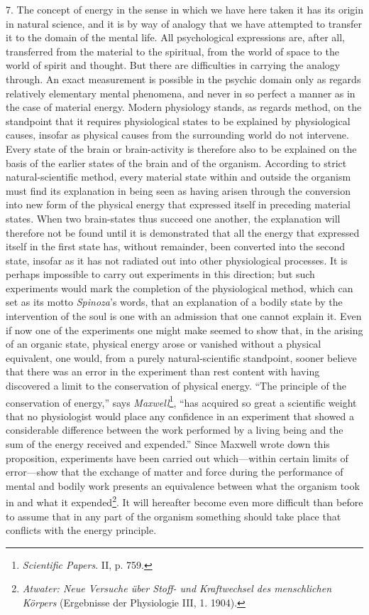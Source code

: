 \documentclass[12pt,a4paper]{book}
\newcommand{\opage}[1]{\marginnote{\footnotesize\textit{[#1]}}}
\begin{document}
7. The concept of energy in the sense in which we have here taken it has
its origin in natural science, and it is by way of analogy that we have
attempted to transfer it to the domain of the mental life. All
psychological expressions are, after all, transferred from the material
to the spiritual, from the world of space to the world of spirit and
thought. But there are difficulties in carrying the analogy through. An
exact measurement is possible in the psychic domain only as regards
relatively elementary mental phenomena, and never in so perfect a manner
as in the case of material energy. Modern physiology stands, as regards
method, on the standpoint that it requires physiological states to be
explained by physiological causes, \opage{23}insofar as physical causes from the
surrounding world do not intervene. Every state of the brain or
brain-activity is therefore also to be explained on the basis of the
earlier states of the brain and of the organism. According to strict
natural-scientific method, every material state within and outside the
organism must find its explanation in being seen as having arisen
through the conversion into new form of the physical energy that
expressed itself in preceding material states. When two brain-states
thus succeed one another, the explanation will therefore not be found
until it is demonstrated that all the energy that expressed itself in
the first state has, without remainder, been converted into the second
state, insofar as it has not radiated out into other physiological
processes. It is perhaps impossible to carry out experiments in this
direction; but such experiments would mark the completion of the
physiological method, which can set as its motto \emph{Spinoza}'s words,
that an explanation of a bodily state by the intervention of the soul is
one with an admission that one cannot explain it. Even if now one of the
experiments one might make seemed to show that, in the arising of an
organic state, physical energy arose or vanished without a physical
equivalent, one would, from a purely natural-scientific standpoint,
sooner believe that there was an error in the experiment than rest
content with having discovered a limit to the conservation of physical
energy. ``The principle of the conservation of energy,'' says
\emph{Maxwell}\footnote{\emph{Scientific Papers}. II, p. 759.}, ``has
acquired so great a scientific weight that no physiologist would place
any confidence in an experiment that showed a considerable difference
between the work performed by a living being and the sum of the energy
received and expended.'' Since Maxwell wrote down this proposition,
experiments have been carried out which---within certain limits of
error---show that the exchange of matter and force during the
performance of mental and bodily work presents an equivalence between
what the organism took in and what it expended\footnote{\emph{Atwater:
Neue Versuche über Stoff- und Kraftwechsel des menschlichen Körpers}
(Ergebnisse der Physiologie III, 1. 1904).}. It will hereafter become
even more difficult than before to assume that in any part of the
organism something should take place that conflicts with the energy
principle.
\end{document}
